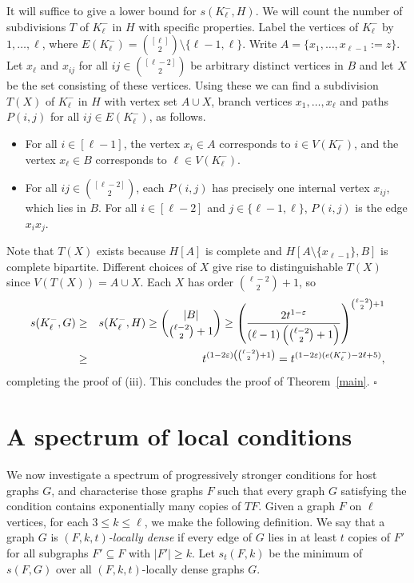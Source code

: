 \documentclass[12pt]{amsart}
\begin{document}
\medskip
\noindent
It will suffice to give a lower bound for $s(K_\ell^-,H)$.
We will count the number of subdivisions $T$ of $K_\ell^-$ in $H$ with specific properties.
Label the vertices of $K_\ell^-$ by $1,\ldots,\ell$, where $E(K_\ell^-) = \binom{[\ell]}{2}\setminus \lbrace \ell-1,\ell \rbrace$.
Write $A = \lbrace x_1,\ldots,x_{\ell-1} := z \rbrace$.
Let $x_\ell$ and $x_{ij}$ for all $ij \in \binom{[\ell-2]}{2}$ be arbitrary distinct vertices in $B$ and let $X$ be the set consisting of these vertices.
Using these we can find a subdivision $T(X)$ of $K_\ell^-$ in $H$ with vertex set $A \cup X$, branch vertices $x_1,\ldots,x_\ell$ and paths $P(i,j)$ for all $ij \in E(K_\ell^-)$, as follows.
\begin{itemize}
\item For all $i \in [\ell-1]$, the vertex $x_i \in A$ corresponds to $i \in V(K_\ell^-)$, and the vertex $x_\ell \in B$ corresponds to $\ell \in V(K_\ell^-)$.
\item For all $ij \in \binom{[\ell-2]}{2}$, each $P(i,j)$ has precisely one internal vertex $x_{ij}$, which lies in $B$. For all $i \in [\ell-2]$ and $j \in \lbrace \ell-1,\ell \rbrace$, $P(i,j)$ is the edge $x_ix_j$. 
\end{itemize}
Note that $T(X)$ exists because $H[A]$ is complete and $H[A \setminus \lbrace x_{\ell-1} \rbrace,B]$ is complete bipartite. Different choices of $X$ give rise to distinguishable $T(X)$ since $V(T(X)) = A \cup X$.
Each $X$ has order $\binom{\ell-2}{2}+1$, so
\begin{eqnarray*}
s(K_\ell^-,G) &\geq& s(K_\ell^-,H) \geq \binom{|B|}{\binom{\ell-2}{2}+1} \geq \left(\frac{2t^{1-{\varepsilon}}}{(\ell-1)\left(\binom{\ell-2}{2}+1\right)}\right)^{\binom{\ell-2}{2}+1}\\
& \geq &t^{(1-2{\varepsilon})\left(\binom{\ell-2}{2}+1\right)}= t^{(1-2{\varepsilon})(e(K_\ell^-)-2\ell+5)},
\end{eqnarray*}
completing the proof of (iii).
This concludes the proof of Theorem~\ref{main}.
\hfill$\square$

\section{A spectrum of local conditions}\label{sec-ext}
We now investigate a spectrum of progressively stronger conditions for host graphs $G$, and characterise those graphs $F$ such that every graph $G$ satisfying the condition contains exponentially many copies of $TF$.
Given a graph $F$ on $\ell$ vertices, for each $3 \leq k \leq \ell$, we make the following definition. 
We say that a graph $G$ is \emph{$(F,k,t)$-locally dense} if every edge of $G$ lies in at least $t$ copies of $F'$ for all subgraphs $F' \subseteq F$ with $|F'| \geq k$.
Let $s_t(F,k)$ be the minimum of $s(F,G)$ over all $(F,k,t)$-locally dense graphs $G$.
\end{document}

